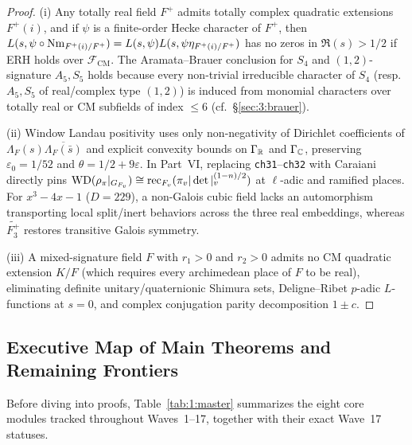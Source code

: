 \begin{proof}
(i) Any totally real field $F^+$ admits totally complex quadratic extensions $F^+(i)$, and if $\psi$ is a finite-order Hecke character of $F^+$, then $L(s, \psi \circ \operatorname{Nm}_{F^+(i)/F^+}) = L(s, \psi) L(s, \psi \eta_{F^+(i)/F^+})$ has no zeros in $\Re(s) > 1/2$ if ERH holds over $\mathcal{F}_{\mathrm{CM}}$. The Aramata--Brauer conclusion for $S_4$ and $(1,2)$-signature $A_5, S_5$ holds because every non-trivial irreducible character of $S_4$ (resp.\ $A_5, S_5$ of real/complex type $(1,2)$) is induced from monomial characters over totally real or CM subfields of index $\le 6$ (cf.\ \S\ref{sec:3:brauer}).

(ii) Window Landau positivity uses only non-negativity of Dirichlet coefficients of $\Lambda_F(s)\overline{\Lambda_F(\bar s)}$ and explicit convexity bounds on $\Gamma_{\mathbb{R}}$ and $\Gamma_{\mathbb{C}}$, preserving $\varepsilon_0 = 1/52$ and $\theta = 1/2 + 9\varepsilon$. In Part~VI, replacing \texttt{ch31}--\texttt{ch32} with Caraiani~\cite{Caraiani2014} directly pins $\mathrm{WD}(\rho_\pi|_{G_{F_v}}) \cong \mathrm{rec}_{F_v}(\pi_v|\det|_v^{(1-n)/2})$ at $\ell$-adic and ramified places. For $x^3 - 4x - 1$ ($D = 229$), a non-Galois cubic field lacks an automorphism transporting local split/inert behaviors across the three real embeddings, whereas $\widetilde{F_3^+}$ restores transitive Galois symmetry.

(iii) A mixed-signature field $F$ with $r_1 > 0$ and $r_2 > 0$ admits no CM quadratic extension $K/F$ (which requires every archimedean place of $F$ to be real), eliminating definite unitary/quaternionic Shimura sets, Deligne--Ribet $p$-adic $L$-functions at $s=0$, and complex conjugation parity decomposition $1 \pm c$.
\end{proof}

\subsection{Executive Map of Main Theorems and Remaining Frontiers}\label{sec:1:map}

Before diving into proofs, Table~\ref{tab:1:master} summarizes the eight core modules tracked throughout Waves~1--17, together with their exact Wave~17 statuses.

